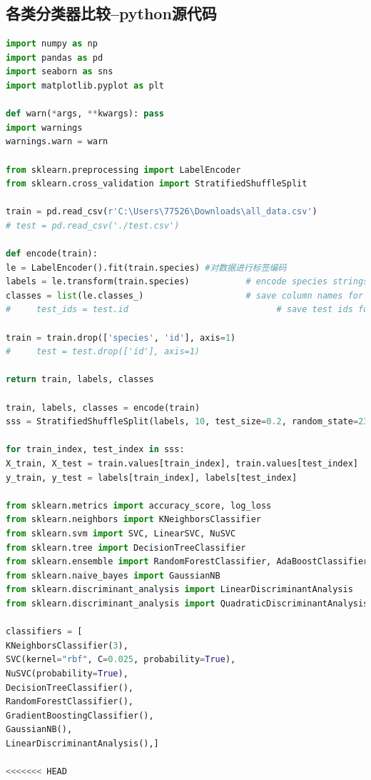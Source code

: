 \documentclass{whutmod}
\begin{document}
\subsection{各类分类器比较--python源代码}
\begin{lstlisting}[language=python]%这里修改语言
import numpy as np
import pandas as pd
import seaborn as sns
import matplotlib.pyplot as plt

def warn(*args, **kwargs): pass
import warnings
warnings.warn = warn

from sklearn.preprocessing import LabelEncoder
from sklearn.cross_validation import StratifiedShuffleSplit

train = pd.read_csv(r'C:\Users\77526\Downloads\all_data.csv')
# test = pd.read_csv('./test.csv')

def encode(train):
le = LabelEncoder().fit(train.species) #对数据进行标签编码
labels = le.transform(train.species)           # encode species strings
classes = list(le.classes_)                    # save column names for submission
#     test_ids = test.id                             # save test ids for submission

train = train.drop(['species', 'id'], axis=1)
#     test = test.drop(['id'], axis=1)

return train, labels, classes

train, labels, classes = encode(train)
sss = StratifiedShuffleSplit(labels, 10, test_size=0.2, random_state=23)

for train_index, test_index in sss:
X_train, X_test = train.values[train_index], train.values[test_index]
y_train, y_test = labels[train_index], labels[test_index]

from sklearn.metrics import accuracy_score, log_loss
from sklearn.neighbors import KNeighborsClassifier
from sklearn.svm import SVC, LinearSVC, NuSVC
from sklearn.tree import DecisionTreeClassifier
from sklearn.ensemble import RandomForestClassifier, AdaBoostClassifier, GradientBoostingClassifier
from sklearn.naive_bayes import GaussianNB
from sklearn.discriminant_analysis import LinearDiscriminantAnalysis
from sklearn.discriminant_analysis import QuadraticDiscriminantAnalysis

classifiers = [
KNeighborsClassifier(3),
SVC(kernel="rbf", C=0.025, probability=True),
NuSVC(probability=True),
DecisionTreeClassifier(),
RandomForestClassifier(),
GradientBoostingClassifier(),
GaussianNB(),
LinearDiscriminantAnalysis(),]

<<<<<<< HEAD





\end{lstlisting}
\end{document}
